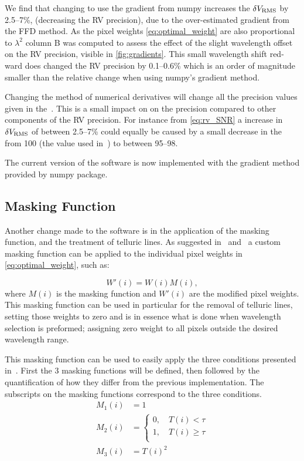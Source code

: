 We find that changing to use the gradient from numpy increases the \(\delta V_{\textrm{RMS}}\) by 2.5--7\%, (decreasing the {RV} precision), due to the over-estimated gradient from the {FFD} method.
As the pixel weights \cref{eq:optimal_weight} are also proportional to \({\lambda}^{2}\) column B was computed to assess the effect of the slight wavelength offset on the {RV} precision, visible in \cref{fig:gradients}.
This small wavelength shift red-ward does changed the {RV} precision by 0.1--0.6\% which is an order of magnitude smaller than the relative change when using numpy's gradient method.

Changing the method of numerical derivatives will change all the precision values given in the~\citet{figueira_radial_2016}.
This is a small impact on on the precision compared to other components of the {RV} precision.
For instance from \cref{eq:rv_SNR} a increase in \(\delta V_{\textrm{RMS}}\) of between 2.5--7\%  could equally be caused by a small decrease in the \snr{} from 100 (the value used in~\citet{figueira_radial_2016}) to between 95--98.

The current version of the software is now implemented with the gradient method provided by numpy package.

\subsection{Masking Function}
\label{subsec:masking_function}
Another change made to the software is in the application of the masking function, and the treatment of telluric lines.
As suggested in~\citet{connes_absolute_1985} and~\citet{bouchy_fundamental_2001} a custom masking function can be applied to the individual pixel weights in \cref{eq:optimal_weight}, such as:

\[W'(i) = W(i)M(i),\label{eq:mask_function}\] where \(M(i)\) is the masking function and \(W'(i)\) are the modified pixel weights.
This masking function can be used in particular for the removal of telluric lines, setting those weights to zero and is in essence what is done when wavelength selection is preformed; assigning zero weight to all pixels outside the desired wavelength range.

This masking function can be used to easily apply the three conditions presented in~\citet{figueira_radial_2016}.
First  the 3 masking functions will be defined, then followed by the quantification of how they differ from the previous implementation.
The subscripts on the masking functions correspond to the three conditions.
\begin{align}
M_1(i) &= 1 \label{eq:mask1}\\
M_2(i) &= \begin{cases}
0, \hspace{1em} T(i) < \tau\\
1, \hspace{1em} T(i) \ge \tau\\
\end{cases}\label{eq:mask2}\\
M_3(i) &= {T(i)}^{2} \label{eq:mask3}
\end{align}

